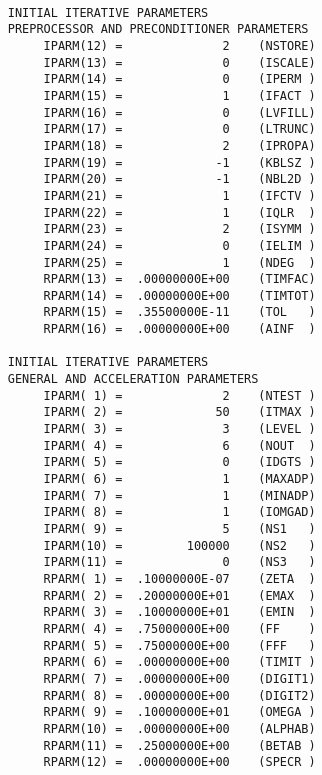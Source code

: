 \newpage
\begin{verbatim} 
 
     INITIAL ITERATIVE PARAMETERS
     PREPROCESSOR AND PRECONDITIONER PARAMETERS
          IPARM(12) =              2    (NSTORE)
          IPARM(13) =              0    (ISCALE)
          IPARM(14) =              0    (IPERM )
          IPARM(15) =              1    (IFACT )
          IPARM(16) =              0    (LVFILL)
          IPARM(17) =              0    (LTRUNC)
          IPARM(18) =              2    (IPROPA)
          IPARM(19) =             -1    (KBLSZ )
          IPARM(20) =             -1    (NBL2D )
          IPARM(21) =              1    (IFCTV )
          IPARM(22) =              1    (IQLR  )
          IPARM(23) =              2    (ISYMM )
          IPARM(24) =              0    (IELIM )
          IPARM(25) =              1    (NDEG  )
          RPARM(13) =  .00000000E+00    (TIMFAC)
          RPARM(14) =  .00000000E+00    (TIMTOT)
          RPARM(15) =  .35500000E-11    (TOL   )
          RPARM(16) =  .00000000E+00    (AINF  )
 
     INITIAL ITERATIVE PARAMETERS
     GENERAL AND ACCELERATION PARAMETERS
          IPARM( 1) =              2    (NTEST )
          IPARM( 2) =             50    (ITMAX )
          IPARM( 3) =              3    (LEVEL )
          IPARM( 4) =              6    (NOUT  )
          IPARM( 5) =              0    (IDGTS )
          IPARM( 6) =              1    (MAXADP)
          IPARM( 7) =              1    (MINADP)
          IPARM( 8) =              1    (IOMGAD)
          IPARM( 9) =              5    (NS1   )
          IPARM(10) =         100000    (NS2   )
          IPARM(11) =              0    (NS3   )
          RPARM( 1) =  .10000000E-07    (ZETA  )
          RPARM( 2) =  .20000000E+01    (EMAX  )
          RPARM( 3) =  .10000000E+01    (EMIN  )
          RPARM( 4) =  .75000000E+00    (FF    )
          RPARM( 5) =  .75000000E+00    (FFF   )
          RPARM( 6) =  .00000000E+00    (TIMIT )
          RPARM( 7) =  .00000000E+00    (DIGIT1)
          RPARM( 8) =  .00000000E+00    (DIGIT2)
          RPARM( 9) =  .10000000E+01    (OMEGA )
          RPARM(10) =  .00000000E+00    (ALPHAB)
          RPARM(11) =  .25000000E+00    (BETAB )
          RPARM(12) =  .00000000E+00    (SPECR )
\end{verbatim}
\newpage
